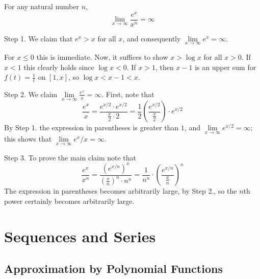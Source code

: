 \documentclass[12pt]{report}
\begin{document}
\begin{subappendices}
    \begin{thm}{}{}
        For any natural number $n$, \begin{equation}
            \lim\limits_{x\rightarrow \infty}\frac{e^x}{x^n} = \infty
        \end{equation}
    \end{thm}
    \begin{proof*}{}{}
        Step 1. We claim that $e^x > x$ for all $x$, and consequently $\lim\limits_{x\rightarrow \infty}e^x = \infty$.

        For $x \leq 0$ this is immediate. Now, it suffices to show $x > \log x$ for all $x > 0$. If $x < 1$ this clearly holds since $\log x < 0$. If $x > 1$, then $x-1$ is an upper sum for $f(t) = \frac{1}{t}$ on $[1,x]$, so $\log x < x-1 < x$.


        Step 2. We claim $\lim\limits_{x\rightarrow \infty}\frac{e^x}{x} = \infty$. First, note that \begin{equation*}
            \frac{e^x}{x} = \frac{e^{x/2}\cdot e^{x/2}}{\frac{x}{2}\cdot 2} = \frac{1}{2}\left(\frac{e^{x/2}}{\frac{x}{2}}\right)\cdot e^{x/2}
        \end{equation*}
        By Step 1. the expression in parentheses is greater than $1$, and $\lim\limits_{x\rightarrow \infty}e^{x/2} = \infty$; this shows that $\lim\limits_{x\rightarrow \infty}e^x/x = \infty$.


        Step 3. To prove the main claim note that \begin{equation*}
            \frac{e^x}{x^n} = \frac{(e^{x/n})^x}{\left(\frac{x}{n}\right)^n\cdot n^n} = \frac{1}{n^n}\cdot \left(\frac{e^{x/n}}{\frac{x}{n}}\right)^n
        \end{equation*}
        The expression in parentheses becomes arbitrarily large, by Step 2., so the $n$th power certainly becomes arbitrarily large.
    \end{proof*}




\end{subappendices}



\chapter{Sequences and Series}

\section{Approximation by Polynomial Functions}
\end{document}
